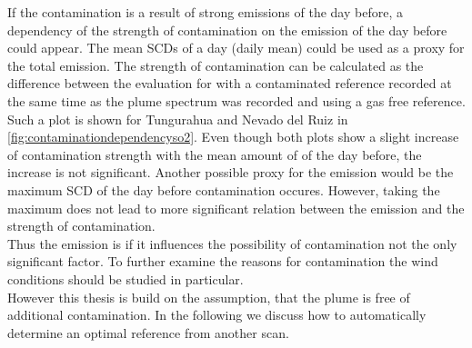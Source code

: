 If the contamination is a result of strong emissions of the day before, a dependency of the strength of contamination on the emission of the day before could appear. 
The mean  SCDs of a day (daily mean) could be used as a proxy for the total emission. The strength of contamination can be calculated as the difference between the evaluation for  with a contaminated reference recorded at the same time as the plume spectrum was recorded and using a gas free reference. Such a plot is shown for Tungurahua and Nevado del Ruiz in \cref{fig:contaminationdependencyso2}. Even though both plots show a slight increase of contamination strength with the mean amount of  of the day before, the increase is not significant. Another possible proxy for the  emission would be the maximum  SCD of the day before contamination occures. However, taking the maximum does not lead to more significant relation between the emission and the strength of contamination. \\
Thus the  emission is if it influences the possibility of contamination not the only significant factor. To further examine the reasons for contamination the wind conditions should be studied in particular. 
\\
However this thesis is build on the assumption, that the plume is free of additional contamination. %
In the following we discuss how to automatically determine an optimal reference from another scan.

